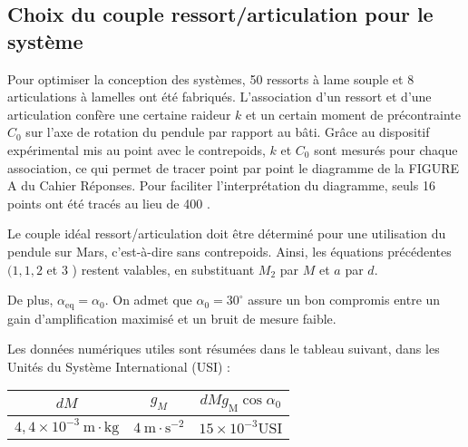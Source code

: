 \subsection{Choix du couple ressort/articulation pour le système}
Pour optimiser la conception des systèmes, 50 ressorts à lame souple et 8 articulations à lamelles ont été fabriqués. L'association d'un ressort et d'une articulation confère une certaine raideur $k$ et un certain moment de précontrainte $C_{0}$ sur l'axe de rotation du pendule par rapport au bâti. Grâce au dispositif expérimental mis au point avec le contrepoids, $k$ et $C_{0}$ sont mesurés pour chaque association, ce qui permet de tracer point par point le diagramme de la FIGURE A du Cahier Réponses. Pour faciliter l'interprétation du diagramme, seuls 16 points ont été tracés au lieu de 400 .

Le couple idéal ressort/articulation doit être déterminé pour une utilisation du pendule sur Mars, c'est-à-dire sans contrepoids. Ainsi, les équations précédentes $(1,1,2$ et 3 ) restent valables, en substituant $M_{2}$ par $M$ et $a$ par $d$.

De plus, $\alpha_{\mathrm{eq}}=\alpha_{0}$. On admet que $\alpha_{0}=30^{\circ}$ assure un bon compromis entre un gain d'amplification maximisé et un bruit de mesure faible.

Les données numériques utiles sont résumées dans le tableau suivant, dans les Unités du Système International (USI) :

\begin{center}
\begin{tabular}{|c|c|c|}
\hline
$d M$ & $g_{M}$ & $d M g_{\mathrm{M}} \cos \alpha_{0}$ \\
\hline
$4,4 \times 10^{-3} \mathrm{~m} \cdot \mathrm{kg}$ & $4 \mathrm{~m} \cdot \mathrm{s}^{-2}$ & $15 \times 10^{-3} \mathrm{USI}$ \\
\hline
\end{tabular}
\end{center}




